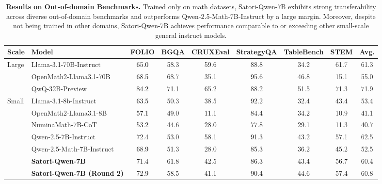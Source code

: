 \begin{table*}[!t]
\centering
\footnotesize
\captionsetup{font=small}
\caption{\textbf{Results on Out-of-domain Benchmarks.} Trained only on math datasets, Satori-Qwen-7B exhibits strong transferability across diverse out-of-domain benchmarks and outperforms Qwen-2.5-Math-7B-Instruct by a large margin. Moreover, despite not being trained in other domains, Satori-Qwen-7B achieves performance comparable to or exceeding other small-scale general instruct models.}
\vspace{-0.5em}
\begin{tabular}{llccccccc}
\toprule[1.5pt]
\textbf{Scale}  & \textbf{Model} & \textbf{FOLIO} & \textbf{BGQA} & \textbf{CRUXEval} & \textbf{StrategyQA} & \textbf{TableBench} & \textbf{STEM} & \textbf{Avg.} \\ \midrule
\multirow{3}{*}{Large} & Llama-3.1-70B-Instruct   & 65.0 & 58.3 & 59.6 & 88.8 & 34.2 & 61.7 & 61.3 \\
                       & OpenMath2-Llama3.1-70B   & 68.5 & 68.7 & 35.1 & 95.6 & 46.8 & 15.1 & 55.0 \\
                       & QwQ-32B-Preview          & 84.2 & 71.1 & 65.2 & 88.2 & 51.5 & 71.3 & 71.9 \\ \midrule
\multirow{7}{*}{Small} & Llama-3.1-8b-Instruct    & 63.5 & 50.3 & 38.5 & 92.2 & 32.4 & 43.4 & 53.4 \\
                       & OpenMath2-Llama3.1-8B    & 57.1 & 49.0 & 11.1 & 84.4 & 34.2 & 10.9 & 41.1 \\
                       & NuminaMath-7B-CoT        & 53.2 & 44.6 & 28.0 & 77.8 & 29.1 & 11.3 & 40.7 \\
                       & Qwen-2.5-7B-Instruct     & 72.4 & 53.0 & 58.1 & 91.3 & 43.2 & 57.1 & 62.5 \\
                       & Qwen-2.5-Math-7B-Instruct & 68.9 & 51.3 & 28.0 & 85.3 & 36.2 & 45.2 & 52.5 \\ \cmidrule{2-9}
                       & \textbf{Satori-Qwen-7B}           & 71.4 & 61.8 & 42.5 & 86.3 & 43.4 & 56.7 & 60.4 \\ 
                       & \textbf{Satori-Qwen-7B (Round 2)} & 72.9 & 58.5 & 41.1 & 90.4 & 44.6 & 57.4 & 60.8 \\ \bottomrule[1.5pt]
\end{tabular}
\label{table:transfer-results}
\end{table*}